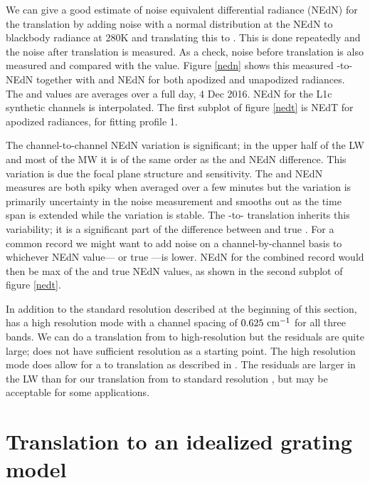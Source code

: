 \documentclass[10pt,twocolumn]{article}
\begin{document}
We can give a good estimate of noise equivalent differential
radiance (NEdN) for the translation by adding noise with a normal
distribution at the {\airs} NEdN to blackbody radiance at 280K and
translating this to {\cris}.  This is done repeatedly and the noise
after translation is measured.  As a check, noise before translation
is also measured and compared with the {\airs} value.  Figure
\ref{nedn} shows this measured {\airs}-to-{\cris} NEdN together with
{\airs} and {\cris} NEdN for both apodized and unapodized radiances.
The {\airs} and {\cris} values are averages over a full day, 4 Dec
2016.  NEdN for the L1c synthetic channels is interpolated.  The
first subplot of figure \ref{nedt} is NEdT for apodized radiances,
for fitting profile 1.

The {\airs} channel-to-channel NEdN variation is significant; in the
upper half of the LW and most of the MW it is of the same order as
the {\airs} and {\cris} NEdN difference.  This variation is due the
{\airs} focal plane structure and sensitivity.  The {\airs} and
{\cris} NEdN measures are both spiky when averaged over a few
minutes but the {\cris} variation is primarily uncertainty in the
noise measurement and smooths out as the time span is extended
while the {\airs} variation is stable.  The {\airs}-to-{\cris}
translation inherits this variability; it is a significant part of
the difference between {\airs} {\cris} and true {\cris}.  For a
common record we might want to add noise on a channel-by-channel
basis to whichever NEdN value---{\airs} {\cris} or true {\cris}---is
lower.  NEdN for the combined record would then be max of the
{\airs} {\cris} and true {\cris} NEdN values, as shown in the second
subplot of figure \ref{nedt}.

In addition to the standard resolution described at the beginning 
of this section, {\cris} has a high resolution mode with a channel
spacing of $0.625~\mbox{cm$^{-1}$}$ for all three bands.  We can do a translation
from {\airs} to high-resolution {\cris} but the residuals are quite
large; {\airs} does not have sufficient resolution as a starting
point.  The high resolution mode does allow for a {\cris} to {\airs}
translation as described in \cite{git:decon}.  The residuals are
larger in the LW than for our translation from {\airs} to standard
resolution {\cris}, but may be acceptable for some applications.

\section{Translation to an idealized grating model}
\label{airsL1d}
\end{document}
